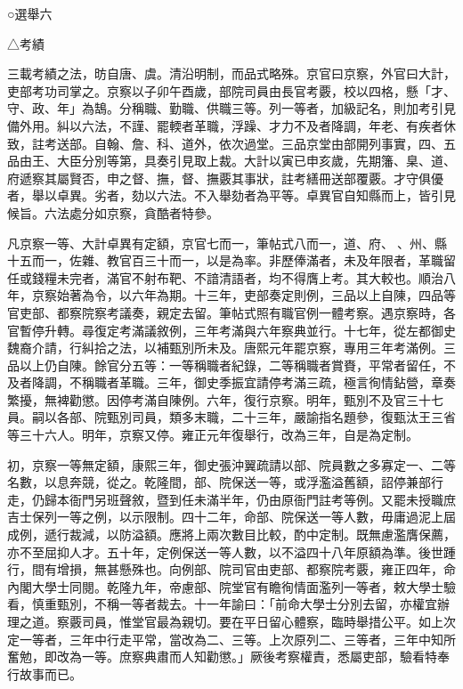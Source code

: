 
\begin{pinyinscope}
○選舉六

△考績

三載考績之法，昉自唐、虞。清沿明制，而品式略殊。京官曰京察，外官曰大計，吏部考功司掌之。京察以子卯午酉歲，部院司員由長官考覈，校以四格，懸「才、守、政、年」為鵠。分稱職、勤職、供職三等。列一等者，加級記名，則加考引見備外用。糾以六法，不謹、罷輭者革職，浮躁、才力不及者降調，年老、有疾者休致，註考送部。自翰、詹、科、道外，依次過堂。三品京堂由部開列事實，四、五品由王、大臣分別等第，具奏引見取上裁。大計以寅已申亥歲，先期籓、臬、道、府遞察其屬賢否，申之督、撫，督、撫覈其事狀，註考繕冊送部覆覈。才守俱優者，舉以卓異。劣者，劾以六法。不入舉劾者為平等。卓異官自知縣而上，皆引見候旨。六法處分如京察，貪酷者特參。

凡京察一等、大計卓異有定額，京官七而一，筆帖式八而一，道、府、、州、縣十五而一，佐雜、教官百三十而一，以是為率。非歷俸滿者，未及年限者，革職留任或錢糧未完者，滿官不射布靶、不諳清語者，均不得膺上考。其大較也。順治八年，京察始著為令，以六年為期。十三年，吏部奏定則例，三品以上自陳，四品等官吏部、都察院察考議奏，親定去留。筆帖式照有職官例一體考察。遇京察時，各官暫停升轉。尋復定考滿議敘例，三年考滿與六年察典並行。十七年，從左都御史魏裔介請，行糾拾之法，以補甄別所未及。唐熙元年罷京察，專用三年考滿例。三品以上仍自陳。餘官分五等：一等稱職者紀錄，二等稱職者賞賚，平常者留任，不及者降調，不稱職者革職。三年，御史季振宜請停考滿三疏，極言徇情鉆營，章奏繁擾，無裨勸懲。因停考滿自陳例。六年，復行京察。明年，甄別不及官三十七員。嗣以各部、院甄別司員，類多末職，二十三年，嚴諭指名題參，復甄汰王三省等三十六人。明年，京察又停。雍正元年復舉行，改為三年，自是為定制。

初，京察一等無定額，康熙三年，御史張沖翼疏請以部、院員數之多寡定一、二等名數，以息奔競，從之。乾隆間，部、院保送一等，或浮濫溢舊額，詔停兼部行走，仍歸本衙門另班聲敘，暨到任未滿半年，仍由原衙門註考等例。又罷未授職庶吉士保列一等之例，以示限制。四十二年，命部、院保送一等人數，毋庸過泥上屆成例，遞行裁減，以防溢額。應將上兩次數目比較，酌中定制。既無慮濫膺保薦，亦不至屈抑人才。五十年，定例保送一等人數，以不溢四十八年原額為準。後世踵行，間有增損，無甚懸殊也。向例部、院司官由吏部、都察院考覈，雍正四年，命內閣大學士同閱。乾隆九年，帝慮部、院堂官有瞻徇情面濫列一等者，敕大學士驗看，慎重甄別，不稱一等者裁去。十一年諭曰：「前命大學士分別去留，亦權宜辦理之道。察覈司員，惟堂官最為親切。要在平日留心體察，臨時舉措公平。如上次定一等者，三年中行走平常，當改為二、三等。上次原列二、三等者，三年中知所奮勉，即改為一等。庶察典肅而人知勸懲。」厥後考察權責，悉屬吏部，驗看特奉行故事而已。


\end{pinyinscope}
